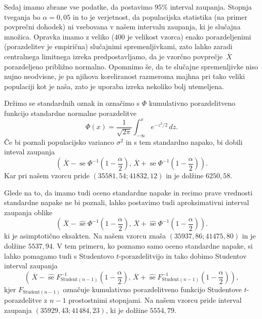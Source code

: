 \documentclass[a4paper,11pt]{article}
\newcommand{\olsi}[1]{\,\overline{\!{#1}}} %
\newcommand{\inv}{^{-1}}
\DeclareMathOperator{\se}{se}
\begin{document}
Sedaj imamo zbrane vse podatke, da postavimo $95\%$ interval zaupanja. Stopnja tveganja bo $\alpha = 0,05$ in to je verjetnost, da populacijska statistika (na primer povprečni dohodek) ni vsebovana v našem intervalu zaupanja, ki je slučajna množica. Opravka imamo z veliko ($400$ je velikost vzorca) enako porazdeljenimi (porazdelitev je empirična) slučajnimi spremenljivkami, zato lahko zaradi centralnega limitnega izreka predpostavljamo, da je vzorčno povprečje $\olsi{X}$ porazdeljeno približno normalno. Opomnimo še, da te slučajne spremenljivke niso nujno neodvisne, je pa njihova koreliranost razmeroma majhna pri tako veliki populaciji kot je naša, zato je uporaba izreka nekoliko bolj utemeljena. 

Držimo se standardnih oznak in označimo s $\Phi$ kumulativno porazdelitveno funkcijo standardne normalne porazdelitve
\[
    \Phi(x) = \frac{1}{\sqrt{2 \pi}} \int_{-\infty}^{x} e^{-z^2/2}\,dz.
\]
Če bi poznali populacijsko varianco $\sigma^2$ in s tem standardno napako, bi dobili inteval zaupanja   
\begin{equation}
    \label{normalni IZ}    
    \left(\olsi{X} - \se \Phi\inv\left(1 - \frac{\alpha}{2}\right), 
    \olsi{X} + \se \Phi\inv\left(1 - \frac{\alpha}{2}\right)\right).
\end{equation}
Kar pri našem vzorcu pride $\left( 35581,54; 41832,12 \right)$ in je dolžine $6250,58$.

Glede na to, da imamo tudi oceno standardne napake in recimo prave vrednosti standardne napake ne bi poznali, lahko postavimo tudi aproksimativni interval zaupanja oblike
\begin{equation}
    \label{aproksimativni IZ}
    \left(\olsi{X} - \hat{\se} \Phi\inv\left(1 - \frac{\alpha}{2}\right), 
    \olsi{X} + \hat{\se} \Phi\inv\left(1 - \frac{\alpha}{2}\right)\right).
\end{equation}
ki je asimptotično eksakten. Na našem vzorcu znaša $\left( 35937,86; 41475,80\right)$ in je dolžine $5537,94$. 
V tem primeru, ko poznamo samo oceno standardne napake, si lahko pomagamo tudi s Studentovo $t$-porazdelitvijo in tako dobimo Studentov interval zaupanja
\begin{equation}
    \label{studentov IZ}
    \left(\olsi{X} - \hat{\se} F_{\text{Student}(n-1)}\inv\left(1 - \frac{\alpha}{2}\right), 
    \olsi{X} + \hat{\se} F_{\text{Student}(n-1)}\inv\left(1 - \frac{\alpha}{2}\right)\right),
\end{equation}
kjer $F_{\text{Student}(n-1)}$ označuje kumulativno porazdelitveno funkcijo Studentove $t$-porazdelitve z $n-1$ prostostnimi stopnjami. Na našem vzorcu pride interval zaupanja $\left(35929,43; 41484,23\right)$, ki je dolžine $5554,79$.
\\
\end{document}
